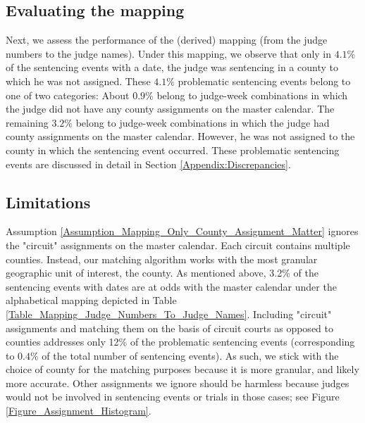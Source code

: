 \documentclass[11pt, oneside]{article}   	%
\theoremstyle{ModifiedStyle}
\begin{document}
  \subsection{Evaluating the mapping}
  	Next, we assess the performance of the (derived) mapping (from the judge numbers to the judge names). Under this mapping, we observe that only in $4.1\%$ of the sentencing events with a date, the judge was sentencing in a county to which he was not assigned. These $4.1\%$ problematic sentencing events belong to one of two categories: About $0.9\%$ belong to judge-week combinations in which the judge did not have any county assignments on the master calendar. The remaining $3.2\%$ belong to judge-week combinations in which the judge had county assignments on the master calendar. However, he was not assigned to the county in which the sentencing event occurred. %
		These problematic sentencing events are discussed in detail in Section \ref{Appendix:Discrepancies}.

  \subsection{Limitations}
  	Assumption \ref{Assumption_Mapping_Only_County_Assignment_Matter} ignores the "circuit" assignments on the master calendar. Each circuit contains multiple counties. Instead, our matching algorithm works with the most granular geographic unit of interest, the county. As mentioned above, 3.2\% of the sentencing events with dates are at odds with the master calendar under the alphabetical mapping depicted in Table \ref{Table_Mapping_Judge_Numbers_To_Judge_Names}. Including "circuit" assignments and matching them on the basis of circuit courts as opposed to counties addresses only 12\% of the problematic sentencing events (corresponding to $0.4\%$ of the total number of sentencing events). As such, we stick with the choice of county for the matching purposes because it is more granular, and likely more accurate. Other assignments we ignore should be harmless because judges would not be involved in sentencing events or trials in those cases; see Figure  \ref{Figure_Assignment_Histogram}.
\end{document}
